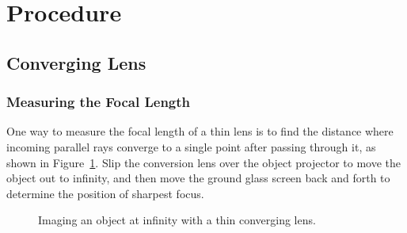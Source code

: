 \documentclass[]{manual}
\newcommand{\clens}[4]{
    \pgfmathsetmacro{\lensRadius}{#2}
    \pgfmathsetmacro{\lensHeight}{#3}
    \pgfmathsetmacro{\lensWidth}{#4}
    \pgfmathsetmacro{\startAngle}{asin(\lensHeight/\lensRadius)}
    
    \draw[dashed] (#1, -\lensHeight*1.2) -- (#1, \lensHeight*1.2) node[above] {PP};
    
    \draw[ultra thick] (#1-\lensWidth,\lensHeight)
    arc[start angle=180-\startAngle,delta angle=2*\startAngle,radius=\lensRadius]
    -- (#1+\lensWidth,-\lensHeight)
    arc[start angle=-\startAngle,delta angle=2*\startAngle,radius=\lensRadius]
    -- cycle;
}
\begin{document}
    
    \FloatBarrier
    \newpage

    \section*{Procedure}
    
    \subsection{Converging Lens}
    
    \subsubsection{Measuring the Focal Length}
    
    One way to measure the focal length of a thin lens is to find the distance where incoming parallel rays converge to a single point after passing through it, as shown in Figure~\ref{fig:object-at-infinity}.
    Slip the conversion lens over the object projector to move the object out to infinity, and then move the ground glass screen back and forth to determine the position of sharpest focus.
    
    
    \begin{figure}
        \centering
        
        
        \caption{
            Imaging an object at infinity with a thin converging lens.
        }
        
        \label{fig:object-at-infinity}
    \end{figure}
\end{document}

